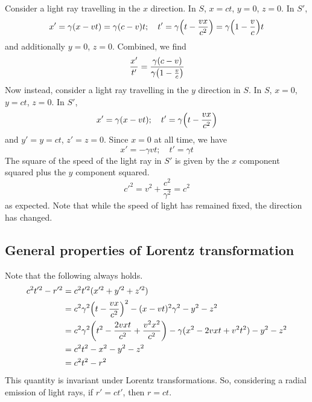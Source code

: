 \begin{example}
Consider a light ray travelling in the \(x\) direction.
In \(S\), \(x=ct\), \(y=0\), \(z=0\).
In \(S'\),
\[
	x' = \gamma(x-vt) = \gamma(c-v)t;\quad t' = \gamma\qty(t - \frac{vx}{c^2}) = \gamma\qty(1 - \frac{v}{c})t
\]
and additionally \(y=0\), \(z=0\).
Combined, we find
\[
	\frac{x'}{t'} = \frac{\gamma(c - v)}{\gamma\qty(1 - \frac{v}{c})}
\]
Now instead, consider a light ray travelling in the \(y\) direction in \(S\).
In \(S\), \(x=0\), \(y=ct\), \(z=0\).
In \(S'\),
\[
	x' = \gamma(x-vt);\quad t' = \gamma\qty(t - \frac{vx}{c^2})
\]
and \(y' = y = ct\), \(z' = z = 0\).
Since \(x=0\) at all time, we have
\[
	x' = -\gamma vt;\quad t' = \gamma t
\]
The square of the speed of the light ray in \(S'\) is given by the \(x\) component squared plus the \(y\) component squared.
\[
	c'^2 = v^2 + \frac{c^2}{\gamma^2} = c^2
\]
as expected.
Note that while the speed of light has remained fixed, the direction has changed.

\subsection{General properties of Lorentz transformation}
Note that the following always holds.
\begin{align*}
	c^2 t'^2 - r'^2 & = c^2 t'^2 (x'^2 + y'^2 + z'^2)                                                                            \\
	                & = c^2 \gamma^2 \qty(t - \frac{vx}{c^2})^2 - (x - vt)^2 \gamma^2 - y^2 - z^2                                \\
	                & = c^2 \gamma^2 \qty(t^2 - \frac{2vxt}{c^2} + \frac{v^2x^2}{c^2}) - \gamma(x^2 - 2vxt + v^2t^2) - y^2 - z^2 \\
	                & = c^2 t^2 - x^2 - y^2 - z^2                                                                                \\
	                & = c^2 t^2 - r^2
\end{align*}
This quantity is invariant under Lorentz transformations.
So, considering a radial emission of light rays, if \(r' = ct'\), then \(r = ct\).
\end{example}
